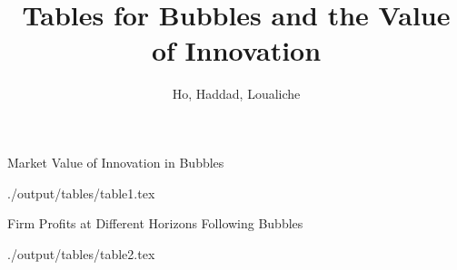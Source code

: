 \documentclass{article}
\begin{document}


\title{Tables for Bubbles and the Value of Innovation}
\author{Ho, Haddad, Loualiche}
\maketitle%


\listoftables

 
\newpage   

\begin{table}[!t]
  \begin{center}
    \caption{Market Value of Innovation in Bubbles} 

    \begin{footnotesize}
      \ExpandableInput ./output/tables/table1.tex
    \end{footnotesize}

  \end{center}
\end{table} 


\newpage   
\clearpage

\begin{table}[!t]
  \begin{center}
    \caption{Firm Profits at Different Horizons Following Bubbles} 

    \begin{footnotesize}
      \ExpandableInput ./output/tables/table2.tex
    \end{footnotesize}

  \end{center}
\end{table} 
\end{document}
